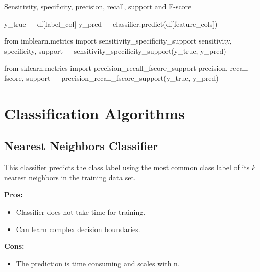 \documentclass[
]{book}
\newenvironment{Shaded}{\begin{snugshade}}{\end{snugshade}}
\newcommand{\ImportTok}[1]{#1}
\newcommand{\NormalTok}[1]{#1}
\newcommand{\OperatorTok}[1]{\textcolor[rgb]{0.81,0.36,0.00}{\textbf{#1}}}
\providecommand{\tightlist}{%
  \setlength{\itemsep}{0pt}\setlength{\parskip}{0pt}}
\begin{document}
Sensitivity, specificity, precision, recall, support and F-score

\begin{Shaded}
\begin{Highlighting}[]
\NormalTok{y\_true }\OperatorTok{=}\NormalTok{ df[label\_col]}
\NormalTok{y\_pred }\OperatorTok{=}\NormalTok{ classifier.predict(df[feature\_cols])}

\ImportTok{from}\NormalTok{ imblearn.metrics }\ImportTok{import}\NormalTok{ sensitivity\_specificity\_support}
\NormalTok{sensitivity, specificity, support }\OperatorTok{=}\NormalTok{ sensitivity\_specificity\_support(y\_true, y\_pred) }

\ImportTok{from}\NormalTok{ sklearn.metrics }\ImportTok{import}\NormalTok{ precision\_recall\_fscore\_support}
\NormalTok{precision, recall, fscore, support }\OperatorTok{=}\NormalTok{ precision\_recall\_fscore\_support(y\_true, y\_pred) }
\end{Highlighting}
\end{Shaded}

\hypertarget{classification-algorithms}{%
\section{Classification Algorithms}\label{classification-algorithms}}

\hypertarget{nearest-neighbors-classifier}{%
\subsection{Nearest Neighbors Classifier}\label{nearest-neighbors-classifier}}

This classifier predicts the class label using the most common class
label of its \(k\) nearest neighbors in the training data set.

\textbf{Pros:}

\begin{itemize}
\tightlist
\item
  Classifier does not take time for training.
\item
  Can learn complex decision boundaries.
\end{itemize}

\textbf{Cons:}

\begin{itemize}
\tightlist
\item
  The prediction is time consuming and scales with n.
\end{itemize}
\end{document}
